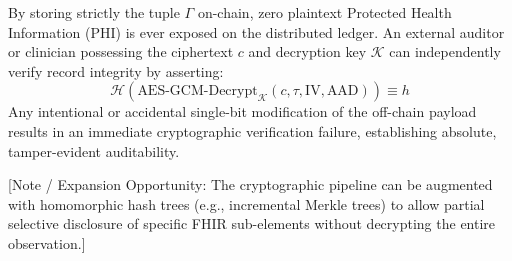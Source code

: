 By storing strictly the tuple $\Gamma$ on-chain, zero plaintext Protected Health Information (PHI) is ever exposed on the distributed ledger. An external auditor or clinician possessing the ciphertext $c$ and decryption key $\mathcal{K}$ can independently verify record integrity by asserting:
\begin{equation}
\mathcal{H}\left(\text{AES-GCM-Decrypt}_{\mathcal{K}}(c, \tau, \text{IV}, \text{AAD})\right) \equiv h
\end{equation}
Any intentional or accidental single-bit modification of the off-chain payload results in an immediate cryptographic verification failure, establishing absolute, tamper-evident auditability.

[Note / Expansion Opportunity: The cryptographic pipeline can be augmented with homomorphic hash trees (e.g., incremental Merkle trees) to allow partial selective disclosure of specific FHIR sub-elements without decrypting the entire observation.]
